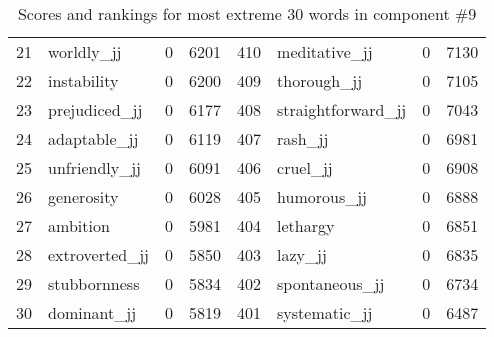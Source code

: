 \begin{table}[tbp]
\begin{tabular}{| rlr@{.}l | rlr@{.}l |}
    21 & worldly\_jj & 0 & 6201    &    410 & meditative\_jj & 0 & 7130 \\
    22 & instability & 0 & 6200    &    409 & thorough\_jj & 0 & 7105 \\
    23 & prejudiced\_jj & 0 & 6177    &    408 & straightforward\_jj & 0 & 7043 \\
    24 & adaptable\_jj & 0 & 6119    &    407 & rash\_jj & 0 & 6981 \\
    25 & unfriendly\_jj & 0 & 6091    &    406 & cruel\_jj & 0 & 6908 \\
    26 & generosity & 0 & 6028    &    405 & humorous\_jj & 0 & 6888 \\
    27 & ambition & 0 & 5981    &    404 & lethargy & 0 & 6851 \\
    28 & extroverted\_jj & 0 & 5850    &    403 & lazy\_jj & 0 & 6835 \\
    29 & stubbornness & 0 & 5834    &    402 & spontaneous\_jj & 0 & 6734 \\
    30 & dominant\_jj & 0 & 5819    &    401 & systematic\_jj & 0 & 6487 \\
    \hline
    \end{tabular}
    \caption{Scores and rankings for most extreme 30 words in component \#9} 
\end{table}
\clearpage
